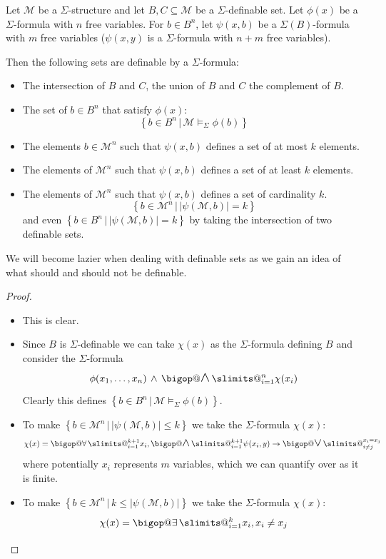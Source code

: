 \documentclass{book}
\makeatletter
\newcommand{\AND}{\, \land \,}
\DeclareRobustCommand\bigop[1]{%
  \mathop{\vphantom{\sum}\mathpalette\bigop@{#1}}\slimits@
}
\newcommand{\bigop@}[2]{%
  \vcenter{%
    \sbox\z@{$#1\sum$}%
    \hbox{\resizebox{
      \ifx#1\displaystyle.7\fi\dimexpr\ht\z@+\dp\z@}{!}{$\m@th#2$}}%
  }%
}
\newcommand{\bigforall}[2]{\DOTSB\bigop{\forall}_{#1}^{#2}}
\newcommand{\bigexists}[2]{\DOTSB\bigop{\exists}_{#1}^{#2}}
\newcommand{\bigand}[2]{\DOTSB\bigop{\mbox{\Large$\land$}}_{#1}^{#2}}
\newcommand{\bigor}[2]{\DOTSB\bigop{\mbox{\Large$\lor$}}_{#1}^{#2}}
\newcommand{\set}[1]{\left\{#1\right\}}
\newcommand{\st}{\,|\,}
\newcommand{\subs}{\subseteq}
\newcommand{\Si}{\Sigma}
\newcommand{\MM}{\mathcal{M}}
\newcommand{\abs}[1]{\left\vert #1 \right\vert}
\newcommand{\<}{\langle}
\renewcommand{\>}{\rangle}
\newcommand{\model}[1]{\vDash_{#1}}
\newcommand{\link}[1]{\hypertarget{#1}{}}
\theoremstyle{definitionstyle}
\theoremstyle{exercisestyle}
\theoremstyle{remarkstyle}
\makeatother
\begin{document}
\begin{lem}
    \link{some_definable_sets}
    Let $\MM$ be a $\Si$-structure and let $B,C \subs \MM$ be a $\Si$-definable
    set.
    Let $\phi(x)$ be a $\Si$-formula with $n$ free variables.
    For $b \in B^n$, let $\psi(x,b)$ be a $\Si(B)$-formula 
    with $m$ free variables ($\psi(x,y)$
    is a $\Si$-formula with $n+m$ free variables).

    Then the following sets are definable by a $\Si$-formula:
    \begin{itemize}
        \item The intersection of $B$ and $C$, the union of $B$ and $C$
            the complement of $B$.
        \item The set of $b \in B^n$ that satisfy $\phi(x)$:
            \[\set{b \in B^n \st \MM \model{\Si} \phi(b)}\]
        \item The elements $b \in \MM^n$ such that $\psi(x,b)$ defines a set of 
            at most $k$ elements.
        \item The elements of $\MM^n$ such that $\psi(x,b)$ defines a set of 
            at least $k$ elements.
        \item The elements of $\MM^n$ such that $\psi(x,b)$ defines a set of 
            cardinality $k$.
            \[\set{b \in \MM^n \st \abs{\psi(\MM,b)} = k}\]
            and even $\set{b \in B^n \st \abs{\psi(\MM,b)} = k}$ by 
            taking the intersection of two definable sets.
    \end{itemize}
    We will become lazier when dealing with definable sets as we gain an idea 
    of what should and should not be definable.
\end{lem}
\begin{proof}
    \begin{itemize}
        \item This is clear.
        \item 
        Since $B$ is $\Si$-definable we can take $\chi(x)$ as the 
        $\Si$-formula defining $B$
        and consider the $\Si$-formula 
        \[\phi(x_1,\dots,x_n) \AND \bigand{i = 1}{n} \chi(x_i)\]
        Clearly this defines $\set{b \in B^n \st \MM \model{\Si} \phi(b)}$.
        \item 
        To make $\set{b \in \MM^n \st \abs{\psi(\MM,b)} \leq k}$
        we take the $\Si$-formula $\chi(x)$:
        \[
            \chi(x) = \bigforall{i = 1}{k + 1} x_i,
            \bigand{i = 1}{k + 1} \psi(x_i,y) \to \bigor{i \ne j}{x_i = x_j}
        \]
        where potentially $x_i$ represents $m$ variables, which we can 
        quantify over as it is finite.
        \item 
        To make $\set{b \in \MM^n \st k \leq \abs{\psi(\MM,b)}}$
        we take the $\Si$-formula $\chi(x)$:
        \[
            \chi(x) = \bigexists{i = 1}{k} x_i, {x_i \ne x_j}
        \]
    \end{itemize}
\end{proof}
\end{document}
